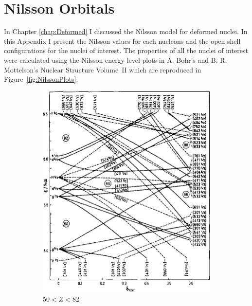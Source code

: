 \documentclass[10pt,a4paper, twoside, openright]{report}
\begin{document}
\chapter{Nilsson Orbitals} \label{chap:Nilsson}
In Chapter \ref{chap:Deformed} I discussed the Nilsson model for deformed nuclei. In this Appendix I present the Nilsson values for each nucleons and the open shell configurations for the nuclei of interest. The properties of all the nuclei of interest were calculated using the Nilsson energy level plots in A. Bohr's and B. R. Mottelson's Nuclear Structure Volume~II \cite{BohrMottVol2} which are reproduced in Figure~\ref{fig:NilssonPlots}. 
\begin{figure}
\centering
\begin{subfigure}[b]{0.45\textwidth}
    \includegraphics[width=\textwidth]{./figures/Nilsson/proton_deformed50.png}
    \caption{$50<Z<82$}
\end{subfigure}	
\quad
\begin{subfigure}[b]{0.45\textwidth}

\end{subfigure}
\end{figure}
\end{document}
